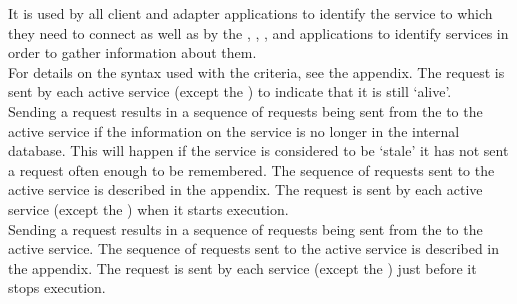 It is used by all client and adapter applications to identify the service to which they
need to connect as well as by the ,
, ,
 and \emph{\CMU} applications to identify services in order
to gather information about them.\\

For details on the syntax used with the criteria, see the 
 appendix.
The  request is sent by each active service
(except the ) to indicate that it is still `alive'.\\

Sending a  request results in a sequence of
requests being sent from the  to the active service if
the information on the service is no longer in the internal database.
This will happen if the service is considered to be `stale' \longDash{} it has not sent a
 request often enough to be remembered.
The sequence of requests sent to the active service is described in the 
 appendix.
The  request is sent by each active service
(except the ) when it starts execution.\\

Sending a  request results in a sequence of
requests being sent from the  to the active service.
The sequence of requests sent to the active service is described in the 
 appendix.
The  request is sent by each service
(except the ) just before it stops execution.\\

